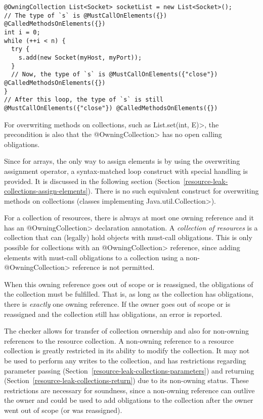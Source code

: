 \begin{verbatim}
@OwningCollection List<Socket> socketList = new List<Socket>();
// The type of `s` is @MustCallOnElements({}) @CalledMethodsOnElements({})
int i = 0;
while (++i < n) {
  try {
    s.add(new Socket(myHost, myPort));
  }
  // Now, the type of `s` is @MustCallOnElements({"close"}) @CalledMethodsOnElements({})
}
// After this loop, the type of `s` is still @MustCallOnElements({"close"}) @CalledMethodsOnElements({})
\end{verbatim}

For overwriting methods on collections, such as \<List.set(int, E)>, the precondition is also that the \<@OwningCollection> has no open calling obligations.

Since for arrays, the only way to assign elements is by using the overwriting assignment operator, a syntax-matched loop construct with special handling is provided. It is discussed in the following section (Section~\ref{resource-leak-collections-assign-elements}). There is no such equivalent construct for overwriting methods on collections (classes implementing \<Java.util.Collection>).


For a collection of resources, there is always at most one owning reference and it has an \<@OwningCollection> declaration annotation. A \textit{collection of resources} is a collection that can (legally) hold objects with must-call obligations. This is only possible for collections with an \<@OwningCollection> reference, since adding elements with must-call obligations to a collection using a non-\<@OwningCollection> reference is not permitted.

When this owning reference goes out of scope or is reassigned, the obligations of the collection must be fulfilled. That is, as long as the collection has obligations, there is \textit{exactly} one owning reference. If the owner goes out of scope or is reassigned and the collection still has obligations, an error is reported.

The checker allows for transfer of collection ownership and also for non-owning references to the resource collection. A non-owning reference to a resource collection is greatly restricted in its ability to modify the collection. It may not be used to perform any writes to the collection, and has restrictions regarding parameter passing (Section~\ref{resource-leak-collections-parameters}) and returning (Section~\ref{resource-leak-collections-return}) due to its non-owning status. These restrictions are necessary for soundness, since a non-owning reference can outlive the owner and could be used to add obligations to the collection after the owner went out of scope (or was reassigned).

